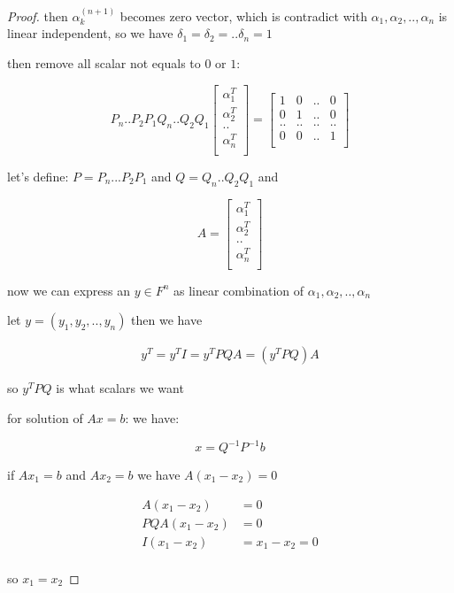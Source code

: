 \begin{proof}
    then $\alpha_k^{(n+1)}$ becomes zero vector, which is contradict with $\alpha_1, \alpha_2, .., \alpha_n$ is linear independent, so we have $\delta_1 = \delta_2 = .. \delta_n = 1$

    then remove all scalar not equals to $0$ or $1$:

    \[
    P_n..P_2P_1Q_n..Q_2Q_1\begin{bmatrix}
            \alpha_1^T \\
            \alpha_2^T \\
            .. \\
            \alpha_n^T \\
    \end{bmatrix} = \begin{bmatrix}
        1 & 0 & .. & 0 \\
        0 & 1 & .. & 0 \\
        .. & .. & .. & .. \\
        0 & 0 & .. & 1 \\
    \end{bmatrix}
    \]

    let's define: $P= P_n...P_2P_1$ and $Q = Q_n..Q_2 Q_1$ and

    \[
        A = \begin{bmatrix}
            \alpha_1^T \\
            \alpha_2^T \\
            .. \\
            \alpha_n^T \\
    \end{bmatrix}
    \]

    now we can express an $y \in F^n$ as linear combination of $\alpha_1, \alpha_2, .. , \alpha_n$

    let $y= (y_1, y_2, .., y_n)$ then we have


    \begin{align*}
        y^T = y^T I = y^T PQA = \left(y^T PQ \right) A
    \end{align*}

    so $y^TPQ $ is what scalars we want

    for solution of $Ax = b$: we have:

    \[
        x = Q^{-1}P^{-1}b
    \]

    if $Ax_1 = b$ and $Ax_2 = b$ we have $A(x_1 - x_2) = 0$ 

    \begin{align*}
        A(x_1 - x_2) &= 0 \\
        PQA(x_1 - x_2) &= 0 \\
        I(x_1 - x_2) & = x_1 - x_2 = 0 \\
    \end{align*}

    so $x_1 = x_2$
\end{proof}

